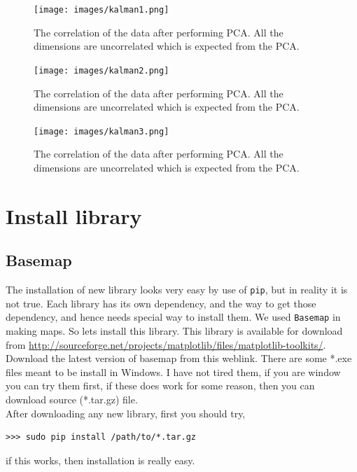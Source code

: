 \documentclass[10pt]{book}
\begin{document}
\beforefig
\begin{figure}[h!]
  \centering
    \texttt{[image: images/kalman1.png]}
  \caption{The correlation of the data after performing PCA. All the dimensions are uncorrelated which is expected from the PCA.}
   \label{fig:pca_2}
\end{figure}
\afterfig

\beforefig
\begin{figure}[h!]
  \centering
    \texttt{[image: images/kalman2.png]}
  \caption{The correlation of the data after performing PCA. All the dimensions are uncorrelated which is expected from the PCA.}
   \label{fig:pca_2}
\end{figure}
\afterfig

\beforefig
\begin{figure}[h!]
  \centering
    \texttt{[image: images/kalman3.png]}
  \caption{The correlation of the data after performing PCA. All the dimensions are uncorrelated which is expected from the PCA.}
   \label{fig:pca_2}
\end{figure}
\afterfig

\appendix


\chapter{Install library}
\section{Basemap}
The installation of new library looks very easy by use of \verb"pip", but in reality it is not true. Each library has its own dependency, and the way to get those dependency, and hence needs special way to install them. We used \verb"Basemap" in making maps. So lets install this library. This library is available for download from \url{http://sourceforge.net/projects/matplotlib/files/matplotlib-toolkits/}. Download the latest version of basemap from this weblink. There are some *.exe files meant to be install in Windows. I have not tired them, if you are window you can try them first, if these does work for some reason, then you can download source (*.tar.gz) file. \\

After downloading any new library, first you should try,
\beforeverb \begin{verbatim}
>>> sudo pip install /path/to/*.tar.gz
\end{verbatim} \afterverb
if this works, then installation is really easy. \\
\end{document}
